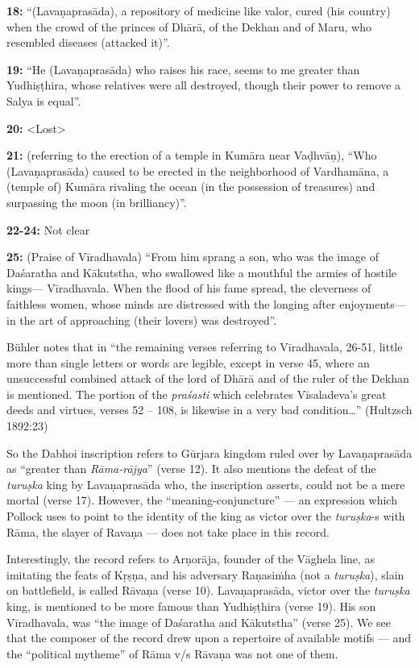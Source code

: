 \smallskip
\noindent
{\bf 18:} “(Lavaṇaprasāda), a repository of medicine like valor, cured (his country) when the crowd of the princes of Dhārā, of the Dekhan and of Maru, who resembled diseases (attacked it)”.

\smallskip
\noindent
{\bf  19:} “He (Lavaṇaprasāda) who raises his race, seems to me greater than Yudhiṣṭhira, whose relatives were all destroyed, though their power to remove a Salya is equal”. 

\smallskip
\noindent
{\bf 20:} <Lost>

\smallskip
\noindent
{\bf 21:} (referring to the erection of a temple in Kumāra near Vaḍhvāṇ), “Who (Lavaṇaprasāda) caused to be erected in the neighborhood of Vardhamāna, a (temple of) Kumāra rivaling the ocean (in the possession of treasures) and surpassing the moon (in brilliancy)”.

\smallskip
\noindent
{\bf 22-24:} Not clear

\smallskip
\noindent
{\bf 25:} (Praise of Vīradhavala) “From him sprang a son, who was the image of Daśaratha and Kākutstha, who swallowed like a mouthful the armies of hostile kings— Vīradhavala. When the flood of his fame spread, the cleverness of faithless women, whose minds are distressed with the longing after enjoyments— in the art of approaching (their lovers) was destroyed”. 

\smallskip
Bühler notes that in “the remaining verses referring to Vīradhavala, 26-51, little more than single letters or words are legible, except in verse 45, where an unsuccessful combined attack of the lord of Dhārā and of the ruler of the Dekhan is mentioned. The portion of the {\sl praśasti} which celebrates Vīsaladeva’s great deeds and virtues, verses 52 – 108, is likewise in a very bad condition…” (Hultzsch 1892:23)

So the Dabhoi inscription refers to Gūrjara kingdom ruled over by Lavaṇaprasāda as “greater than {\sl Rāma-rājya}” (verse 12). It also mentions the defeat of the {\sl turuṣka} king by Lavaṇaprasāda who, the inscription asserts, could not be a mere mortal (verse 17). However, the “meaning-conjuncture” — an expression which Pollock uses to point to the identity of the king as victor over the {\sl turuṣka}-s with Rāma, the slayer of Ravaṇa — does not take place in this record.  

Interestingly, the record refers to Arṇorāja, founder of the Vāghela line, as imitating the feats of Kṛṣṇa, and his adversary Raṇasiṁha (not a {\sl turuṣka}), slain on battlefield, is called Rāvaṇa (verse 10). Lavaṇaprasāda, victor over the {\sl turuṣka} king, is mentioned to be more famous than Yudhiṣṭhira (verse 19). His son Vīradhavala, was “the image of Daśaratha and Kākutstha” (verse 25). We see that the composer of the record drew upon a repertoire of available motifs — and the “political mytheme” of Rāma v/s Rāvaṇa was not one of them. 

